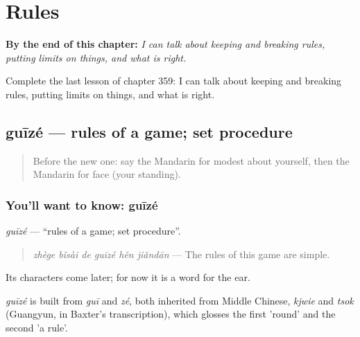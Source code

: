 
\chapter{Rules}
\label{ch:zh-rules}

\begin{chapteropening}
\textbf{By the end of this chapter:} \emph{I can talk about keeping and breaking rules, putting limits on things, and what is right.}

Complete the last lesson of chapter 359: I can talk about keeping and breaking rules, putting limits on things, and what is right.
\end{chapteropening}

\section[guīzé]{guīzé — rules of a game; set procedure}

\label{lesson:ZH-C359-guize}



\begin{quote}
Before the new one: say the Mandarin for modest about yourself, then the Mandarin for face (your standing).
\end{quote}

\subsection*{You'll want to know: guīzé}
\emph{guīzé} — \textquotedblleft{}rules of a game; set procedure\textquotedblright{}.

\begin{quote}
\emph{zhège bǐsài de guīzé hěn jiǎndān} — The rules of this game are simple.
\end{quote}

Its characters come later; for now it is a word for the ear.

\begin{cousinweb}
\emph{guīzé} is built from \emph{guī} and \emph{zé}, both inherited from Middle Chinese, \emph{kjwie} and \emph{tsok} (Guangyun, in Baxter's transcription), which glosses the first 'round' and the second 'a rule'.
\end{cousinweb}

